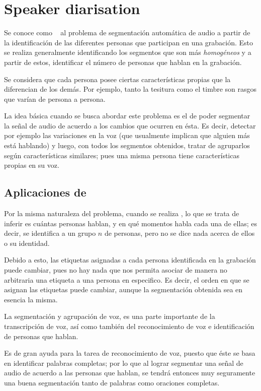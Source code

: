
\chapter{Speaker diarisation}\label{ch:chap4}

Se conoce como \SD~ al problema de segmentación automática de audio a partir de la identificación de las diferentes personas que participan en una grabación. Esto se realiza generalmente identificando los segmentos que son más \textit{homogéneos} y a partir de estos, identificar el número de personas que hablan en la grabación.

Se considera que cada persona posee ciertas características propias que la diferencian de los demás. Por ejemplo, tanto la tesitura como el timbre son rasgos que varían de persona a persona.

La idea básica cuando se busca abordar este problema es el de poder segmentar la señal de audio de acuerdo a los cambios que ocurren en ésta. Es decir, detectar por ejemplo las variaciones en la voz (que usualmente implican que alguien más está hablando) y luego, con todos los segmentos obtenidos, tratar de agruparlos según características similares; pues una misma persona tiene características propias en su voz. 

\section{Aplicaciones de \sd}

Por la misma naturaleza del problema, cuando se realiza \sd, lo que se trata de inferir es cuántas personas hablan, y en qué momentos habla cada una de ellas; es decir, se identifica a un grupo $n$ de personas, pero no se dice nada acerca de ellos o su identidad. 

Debido a esto, las etiquetas asignadas a cada persona identificada en la grabación puede cambiar, pues no hay nada que nos permita asociar de manera no arbitraria una etiqueta a una persona en especifico. Es decir, el orden en que se asignan las etiquetas puede cambiar, aunque la segmentación obtenida sea en esencia la misma.

La segmentación y agrupación de voz, es una parte importante de la transcripción de voz, así como también del reconocimiento de voz e identificación de personas que hablan. 

Es de gran ayuda para la tarea de reconocimiento de voz, puesto que éste se basa en identificar palabras completas; por lo que al lograr segmentar una señal de audio de acuerdo a las personas que hablan, se tendrá entonces muy seguramente una buena segmentación tanto de palabras como oraciones completas.

